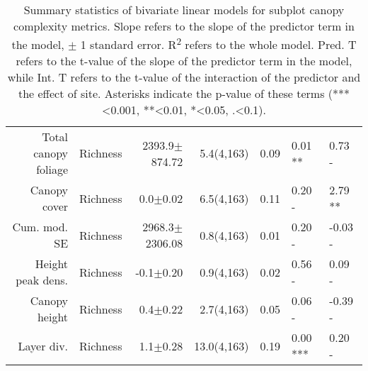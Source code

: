 \begin{table}[H]
\begin{tabular}{rrrrrll}
  Total canopy foliage & Richness & 2393.9$\pm$874.72 & 5.4(4,163) & 0.09 & 0.01 ** & 0.73 - \\ 
  Canopy cover & Richness & 0.0$\pm$0.02 & 6.5(4,163) & 0.11 & 0.20 - & 2.79 ** \\ 
  Cum. mod. SE & Richness & 2968.3$\pm$2306.08 & 0.8(4,163) & 0.01 & 0.20 - & -0.03 - \\ 
  Height peak dens. & Richness & -0.1$\pm$0.20 & 0.9(4,163) & 0.02 & 0.56 - & 0.09 - \\ 
  Canopy height & Richness & 0.4$\pm$0.22 & 2.7(4,163) & 0.05 & 0.06 - & -0.39 - \\ 
  Layer div. & Richness & 1.1$\pm$0.28 & 13.0(4,163) & 0.19 & 0.00 *** & 0.20 - \\ 
   \hline
\end{tabular}
\caption{Summary statistics of bivariate linear models for subplot canopy complexity metrics. Slope refers to the slope of the predictor term in the model, $\pm{}$ 1 standard error. R\textsuperscript{2} refers to the whole model. Pred. T refers to the t-value of the slope of the predictor term in the model, while Int. T refers to the t-value of the interaction of the predictor and the effect of site. Asterisks indicate the p-value of these terms (***<0.001, **<0.01, *<0.05, .<0.1).} 
\label{mod_bivar_lm_summ}
\end{table}

